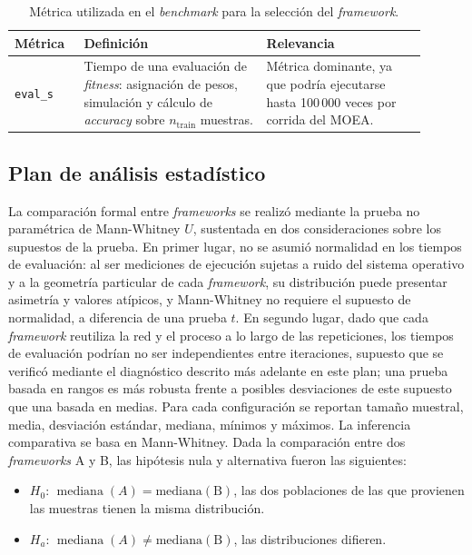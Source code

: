 \begin{table}[htbp]
\centering
\caption{Métrica utilizada en el \textit{benchmark} para la selección del \textit{framework}.}
\label{tab:framework-metricas-met}
\small
\begin{tabular}{p{0.15\linewidth}p{0.4\linewidth}p{0.35\linewidth}}
\toprule
Métrica & Definición & Relevancia \\
\midrule
\texttt{eval\_s} &
Tiempo de una evaluación de \textit{fitness}: asignación de pesos, simulación y cálculo de \textit{accuracy} sobre $n_{\mathrm{train}}$ muestras. &
Métrica dominante, ya que podría ejecutarse hasta 100\,000 veces por corrida del MOEA.\\ \hline
\end{tabular}
\end{table}


\subsection{Plan de análisis estadístico}

La comparación formal entre \textit{frameworks} se realizó mediante la prueba no paramétrica de Mann-Whitney $U$, sustentada en dos consideraciones sobre los supuestos de la prueba. En primer lugar, no se asumió normalidad en los tiempos de evaluación: al ser mediciones de ejecución sujetas a ruido del sistema operativo y a la geometría particular de cada \textit{framework}, su distribución puede presentar asimetría y valores atípicos, y Mann-Whitney no requiere el supuesto de normalidad, a diferencia de una prueba $t$. En segundo lugar, dado que cada \textit{framework} reutiliza la red y el proceso a lo largo de las repeticiones, los tiempos de evaluación podrían no ser independientes entre iteraciones, supuesto que se verificó mediante el diagnóstico descrito más adelante en este plan; una prueba basada en rangos es más robusta frente a posibles desviaciones de este supuesto que una basada en medias. Para cada configuración se reportan tamaño muestral, media, desviación estándar, mediana, mínimos y máximos. La inferencia comparativa se basa en Mann-Whitney. Dada la comparación entre dos \textit{frameworks} A y B, las hipótesis nula y alternativa fueron las siguientes:

\begin{itemize}
    \item $H_0$: $\operatorname{mediana}(A)=\operatorname{mediana(B)}$, las dos poblaciones de las que provienen las muestras tienen la misma distribución.
    \item $H_a$: $\operatorname{mediana}(A)\neq\operatorname{mediana(B)}$, las distribuciones difieren.
\end{itemize}

